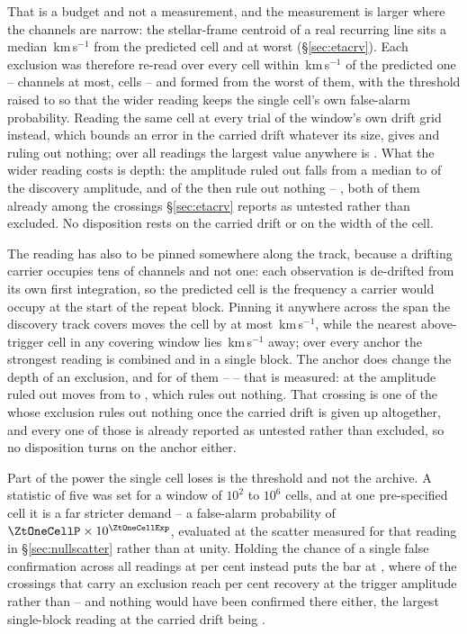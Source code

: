 That is a budget and not a measurement, and the measurement is larger where
the channels are narrow: the stellar-frame centroid of a real recurring line
sits a median \RgCenMedKms\,km\,s$^{-1}$ from the predicted cell and
\RgCenMaxKms{} at worst (\S\ref{sec:etacrv}). Each exclusion was
therefore re-read over every cell within \RgTolKms\,km\,s$^{-1}$ of the
predicted one -- \RgTolChMax{} channels at most, \RgNTrialMax{} cells -- and
formed from the worst of them, with the threshold raised to \RgThrMax{} so
that the wider reading keeps the single cell's own false-alarm probability.
Reading the same cell at every trial of the window's own drift grid instead,
which bounds an error in the carried drift whatever its size, gives
\ZtFracWideMed{} and \ZtNWideVac{} ruling out nothing; over all
\RcNRepeatMeas{} readings the largest value anywhere is \RcTMax.
What the wider reading costs is depth: the amplitude ruled out falls from a
median \RcFracMed{} to \RgFracMed{} of the discovery amplitude, and
\RgNVac{} of the \RcNExcl{} then rule out nothing -- \RgVacList, both of them
already among the \HjNPowerLo{} crossings \S\ref{sec:etacrv} reports as
untested rather than excluded. No disposition rests on the carried drift or
on the width of the cell.

The reading has also to be pinned somewhere along the track, because a
drifting carrier occupies tens of channels and not one: each observation is
de-drifted from its own first integration, so the predicted cell is the
frequency a carrier would occupy at the start of the repeat block. Pinning it
anywhere across the span the discovery track covers moves the cell by at most
\AnSpanMaxKms\,km\,s$^{-1}$, while the nearest above-trigger cell in any
covering window lies \AnNearKms\,km\,s$^{-1}$ away; over every anchor the
strongest reading is \AnTBest{} combined and \AnTSingle{} in a single block.
The anchor does change the depth of an exclusion, and for \AnNMeas{} of them
-- \AnMeasStars{} -- that is measured: at \AnWorstStar{} the amplitude ruled
out moves from \AnFracFrom{} to \AnFracTo, which rules out nothing. That
crossing is one of the \AnNWideVac{} whose exclusion rules out nothing once
the carried drift is given up altogether, and every one of those is already
reported as untested rather than excluded, so no disposition turns on the
anchor either.

Part of the power the single cell loses is the threshold and not the archive.
A statistic of five was set for a window of $10^{2}$ to $10^{6}$ cells, and at
one pre-specified cell it is a far stricter demand -- a false-alarm
probability of $\ZtOneCellP\times10^{\ZtOneCellExp}$, evaluated at the scatter
measured for that reading in \S\ref{sec:nullscatter} rather than at unity.
Holding the chance of a single false confirmation across all
\RcNRepeatMeas{} readings at \ZtFwPct{} per cent instead puts the bar at
\ZtTrialThr, where \HjNPowerTrial{} of the crossings that carry an exclusion
reach \RcPowerLevel{} per cent recovery at the trigger amplitude rather than
\HjNPowerHi{} -- and nothing would have been confirmed there either, the
largest single-block reading at the carried drift being \RcTMatched.

